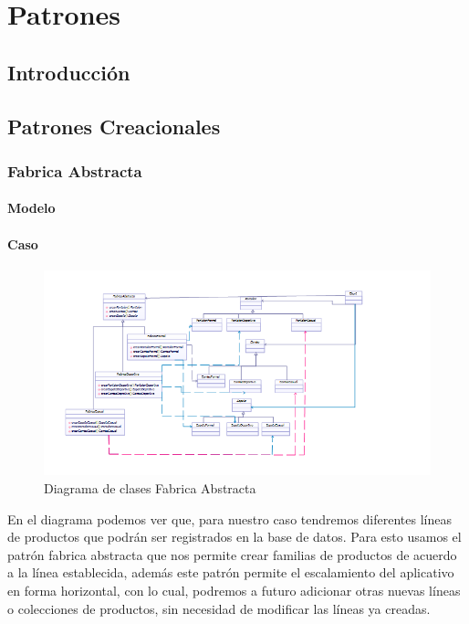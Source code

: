 \chapter{Patrones}

\section{Introducción}

\section{Patrones Creacionales}



\subsection{Fabrica Abstracta}
\subsubsection{Modelo}
\newpage
\subsubsection{Caso}

	\begin{figure}[h!]
		\centering
		\includegraphics[width=1.2\linewidth]{arquitectura/imagenes/DiagramaFabricaAbstracta}
		\caption{Diagrama de clases Fabrica Abstracta}
	\end{figure}
	
	
	
	En el diagrama podemos ver que, para nuestro caso tendremos diferentes líneas de productos que podrán ser registrados en la base de datos. Para esto usamos el patrón fabrica abstracta que nos permite crear familias de productos de acuerdo a la línea establecida, además este patrón permite el escalamiento del aplicativo en forma horizontal, con lo cual, podremos a futuro adicionar otras nuevas líneas o colecciones de productos, sin necesidad de modificar las líneas ya creadas.
\newpage


